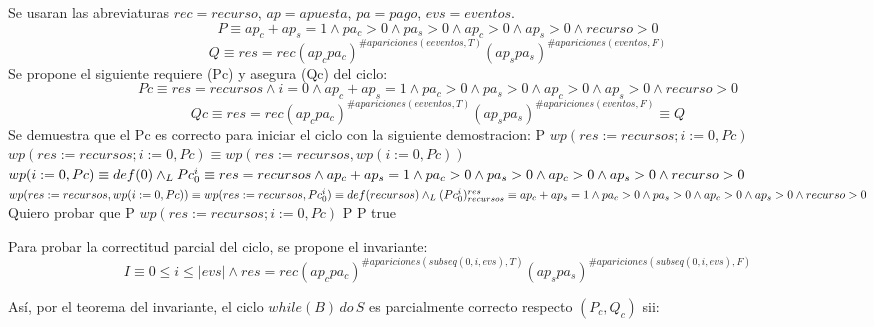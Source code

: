 \documentclass[10pt,a4paper]{article}
\begin{document}
Se usaran las abreviaturas $rec = recurso$, $ap = apuesta$, $pa = pago$, $evs = eventos$.\\
\begin{equation*}
    P \equiv ap_c + ap_s = 1 \land pa_c > 0 \land pa_s > 0 \land ap_c > 0 \land ap_s > 0 \land recurso > 0
\end{equation*}
\begin{equation*}
    Q \equiv  res = rec (ap_c pa_c)^{\# apariciones(eeventos, T)}(ap_s pa_s)^{\#apariciones(eventos, F)}
\end{equation*}
Se propone el siguiente requiere (Pc) y asegura (Qc) del ciclo:
\begin{equation*}
    Pc \equiv res=recursos \land i=0 \land ap_c + ap_s = 1 \land pa_c > 0 \land pa_s > 0 \land ap_c > 0 \land ap_s > 0 \land recurso > 0
\end{equation*}
\begin{equation*}
    Qc \equiv res = rec (ap_c pa_c)^{\# apariciones(eeventos, T)}(ap_s pa_s)^{\#apariciones(eventos, F)} \equiv Q
\end{equation*}
Se demuestra que el Pc es correcto para iniciar el ciclo con la siguiente demostracion: \newline P \implica $wp(res:=recursos;i:=0,Pc)$ \newline $wp(res:=recursos;i:=0,Pc) \equiv wp(res:=recursos,wp(i:=0,Pc))$ \newline $wp(i:=0,Pc) \equiv def(0) \land _L Pc_{0}^i \equiv res=recursos \land ap_c + ap_s = 1 \land pa_c > 0 \land pa_s > 0 \land ap_c > 0 \land ap_s > 0 \land recurso > 0$ \newline $wp(res:=recursos,wp(i:=0,Pc)) \equiv wp(res:=recursos,Pc_{0}^i) \equiv def(recursos) \land _L (Pc_{0}^i)_{recursos}^{res} \equiv ap_c + ap_s = 1 \land pa_c > 0 \land pa_s > 0 \land ap_c > 0 \land ap_s > 0 \land recurso > 0$ \newline
Quiero probar que \newline P \implica $wp(res:=recursos;i:=0,Pc)$ \newline \equiv P \implica P \equiv true \newline

Para probar la correctitud parcial del ciclo, se propone el invariante:
\begin{equation*}
	I \equiv 0 \leq i \leq |evs| \wedge res = rec (ap_c pa_c)^{\# apariciones(subseq(0, i, evs), T)}(ap_s pa_s)^{\#apariciones(subseq(0, i, evs), F)}
\end{equation*}	

Así, por el teorema del invariante, el ciclo $while(B) \, do \, S$ es parcialmente correcto respecto $(P_c, Q_c) $ sii:
\end{document}
